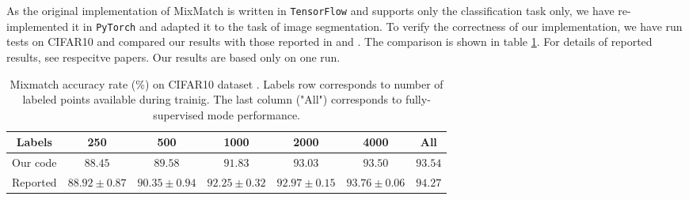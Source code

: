 As the original implementation of MixMatch is written in \texttt{TensorFlow} and supports only the classification task only, we have re-implemented it in \texttt{PyTorch}
and adapted it to the task of image segmentation. To verify the correctness of our implementation, we have run tests on CIFAR10 and compared our results with those reported in \cite{mixmatch-2019} and \cite{wide-resnet-2017}. The 
comparison is shown in table \ref{tab:mixmatch-cifar10}. For details of reported results, see respecitve papers. Our results are based only on one run. 
\begin{table}[htb]
    \begin{tabular}{|c|c|c|c|c|c|c|}
    \hline
    Labels  & 250 & 500 & 1000 & 2000 & 4000 & All \\
    \hline
    Our code & $88.45$ & $89.58$& $91.83$ & $93.03$ & $93.50$ & $93.54$\\
    \hline
    Reported & $88.92\pm0.87$ & $90.35\pm0.94$ & $92.25\pm0.32$ & $92.97\pm0.15$ & $93.76\pm 0.06$ & $94.27$\\
    \hline
    \end{tabular}
    \caption[Mixmatch accuracy on CIFAR10]{Mixmatch accuracy rate (\%) on CIFAR10 dataset \cite{cifar10-2009}. Labels row corresponds to number of labeled points available during trainig. 
    The last column ("All") corresponds to fully-supervised mode performance.}
    \label{tab:mixmatch-cifar10}
\end{table}
     